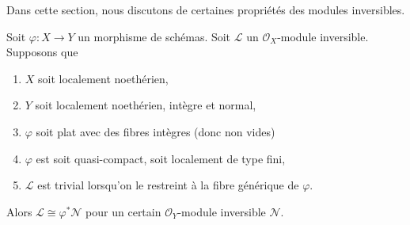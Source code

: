 \noindent
Dans cette section, nous discutons de certaines propriétés des modules
inversibles.

\begin{lemma}
\label{lemma-in-image-pullback}
Soit  $\varphi : X \to Y$  un morphisme de schémas. Soit  $\mathcal{L}$  un
 $\mathcal{O}_X$-module inversible. Supposons que
\begin{enumerate}
\item $X$  soit localement noethérien,
\item $Y$  soit localement noethérien, intègre et normal,
\item $\varphi$  soit plat avec des fibres intègres (donc non vides)
\item $\varphi$  est soit quasi-compact, soit localement de type fini,
\item $\mathcal{L}$  est trivial lorsqu'on le restreint à la fibre générique de
 $\varphi$.
\end{enumerate}
Alors  $\mathcal{L} \cong \varphi^*\mathcal{N}$  pour un certain  $\mathcal{O}_Y$-module inversible  $\mathcal{N}$.
\end{lemma}

